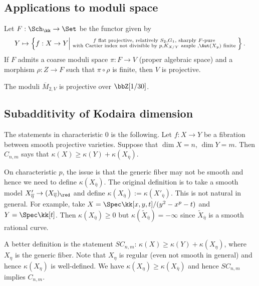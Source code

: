 \subsection{Applications to moduli space}

\begin{theorem}[Pat'12]
	Let $F: \Sch_\kk \to \Set$ be the functor given by
	\[ Y \mapsto \left\{ f: X \to Y \middle| \substack{ f \text{ flat projective, relatively } S_2, G_1, \text{ sharply $F$-pure} \\ \text{ with Cartier index not divisible by } p, K_{X/Y} \text{ ample }, \Aut(X_y) \text{ finite }} \right\}. \]
	If $F$ admits a coarse moduli space $\pi: F \to V$ (proper algebraic space) and a morphism $\rho: Z \to F$ such that $\pi \circ \rho$ is finite, then $V$ is projective.
\end{theorem}

\begin{theorem}[Pat'17]
	The moduli $\overline{M}_{2,V}$ is projective over $\bbZ[1/30]$.
\end{theorem}


\subsection{Subadditivity of Kodaira dimension}

The statements in characteristic $0$ is the following.
Let $f: X \to Y$ be a fibration between smooth projective varieties.
Suppose that $\dim X = n$, $\dim Y = m$.
Then $C_{n,m}$ says that $\kappa(X) \geq \kappa(Y) + \kappa(X_{\overline{\eta}})$.

On characteristic $p$, the issue is that the generic fiber may not be smooth and hence we need to define $\kappa(X_{\overline{\eta}})$.
The original definition is to take a smooth model $X'_{\overline{\eta}} \to (X_{\overline{\eta}})_{\red}$ and define $\kappa(X_{\overline{\eta}}) := \kappa(X'_{\overline{\eta}})$.
This is not natural in general.
For example, take $X = \Spec \kk[x,y,t]/(y^2 - x^p - t)$ and $Y = \Spec \kk[t]$.
Then $\kappa(X_{\overline{\eta}}) \geq 0$ but $\kappa(\widetilde{X}_{\overline{\eta}}) = -\infty$ since $\widetilde{X}_{\overline{\eta}}$ is a smooth rational curve.

A better definition is the statement $SC_{n,m}$: $\kappa(X) \geq \kappa(Y) + \kappa(X_\eta)$, where $X_\eta$ is the generic fiber.
Note that $X_\eta$ is regular (even not smooth in general) and hence $\kappa(X_\eta)$ is well-defined.
We have $\kappa(X_\eta) \geq \kappa(X_{\overline{\eta}})$ and hence $SC_{n,m}$ implies $C_{n,m}$.

